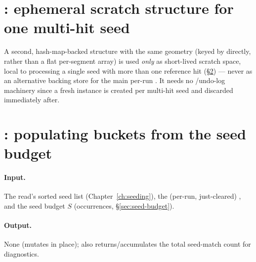 \section{: ephemeral scratch structure for one multi-hit seed}
\label{sec:buckets-hash}

A second, hash-map-backed structure with the same  geometry (keyed by
 directly, rather than a flat per-segment array) is used \emph{only} as short-lived
scratch space, local to processing a single seed with more than one reference hit
(\S\ref{sec:match-seeds}) --- never as an alternative backing store for the main per-run
. It needs no /undo-log machinery since a fresh instance is created
per multi-hit seed and discarded immediately after.

\section{: populating buckets from the seed budget}
\label{sec:match-seeds}

\paragraph{Input.} The read's sorted seed list (Chapter~\ref{ch:seeding}), the (per-run,
just-cleared) , and the seed budget $S$ (occurrences, \S\ref{sec:seed-budget}).

\paragraph{Output.} None (mutates  in place); also returns/accumulates the total
seed-match count for diagnostics.

